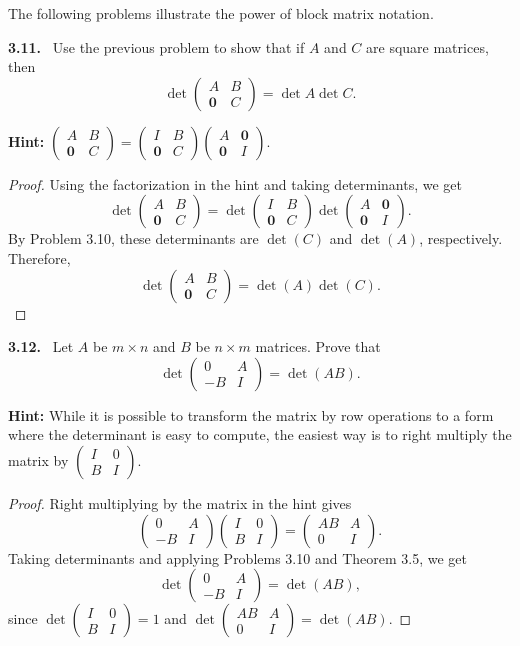\documentclass[12pt]{amsart}
\newcommand{\pmat}[1]{\begin{pmatrix}#1\end{pmatrix}}
\theoremstyle{plain}
\theoremstyle{definition}
\theoremstyle{remark}
\newenvironment{problem}[1]{\par\medskip\noindent\textbf{#1.}\ }{\par\smallskip}
\begin{document}
\medskip
The following problems illustrate the power of block matrix notation.

\begin{problem}{3.11}
Use the previous problem to show that if $A$ and $C$ are square matrices, then
\[
  \det \pmat{A & B \\ \bm{0} & C} = \det A \det C.
\]

\noindent\textbf{Hint:}
$\pmat{A & B \\ \bm{0} & C} = \pmat{I & B \\ \bm{0} & C} \pmat{A & \bm{0} \\ \bm{0} & I}$.
\end{problem}

\begin{proof}
Using the factorization in the hint and taking determinants, we get
\[
\det\pmat{A&B\\\bm{0}&C}
=
\det\pmat{I&B\\\bm{0}&C}
\det\pmat{A&\bm{0}\\\bm{0}&I}.
\]
By Problem 3.10, these determinants are $\det(C)$ and $\det(A)$, respectively. Therefore,
\[
\det\pmat{A&B\\\bm{0}&C}=\det(A)\det(C).
\]
\end{proof}


\begin{problem}{3.12}
Let $A$ be $m\times n$ and $B$ be $n\times m$ matrices. Prove that
\[
  \det \pmat{0 & A \\ -B & I} = \det(AB).
\]

\noindent\textbf{Hint:} While it is possible to transform the matrix by row operations to a form where the determinant is easy to compute, the easiest way is to right multiply the matrix by $\pmat{I & 0 \\ B & I}$.
\end{problem}

\begin{proof}
Right multiplying by the matrix in the hint gives
\[
\pmat{0&A\\-B&I}
\pmat{I&0\\B&I}
=
\pmat{AB&A\\0&I}.
\]
Taking determinants and applying Problems 3.10 and Theorem 3.5, we get
\[
\det\pmat{0&A\\-B&I}
=
\det(AB),
\]
since $\det\pmat{I&0\\B&I}=1$ and
$\det\pmat{AB&A\\0&I}=\det(AB)$.
\end{proof}
\end{document}
